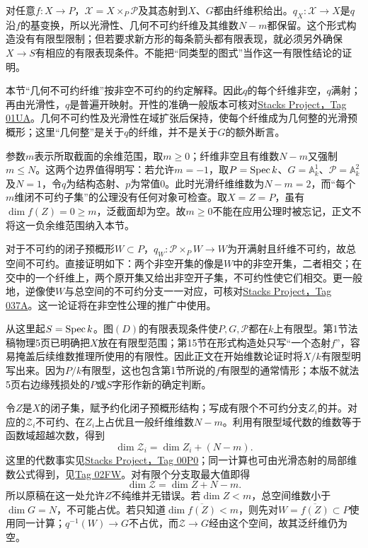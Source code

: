 对任意$f:X\to P$，$\mathcal X=X\times_P\mathcal P$及其态射到$X$、$G$都由纤维积给出。$q_X:\mathcal X\to X$是$q$沿$f$的基变换，所以光滑性、几何不可约纤维及其维数$N-m$都保留。这个形式构造没有有限型限制；但若要求新方形的每条箭头都有限表现，就必须另外确保$X\to S$有相应的有限表现条件。不能把“同类型的图式”当作这一有限性结论的证明。

本节“几何不可约纤维”按非空不可约的约定解释。因此$q$的每个纤维非空，$q$满射；再由光滑性，$q$是普遍开映射。开性的准确一般版本可核对\href{https://stacks.math.columbia.edu/tag/01UA}{Stacks Project，Tag 01UA}。几何不可约性及光滑性在域扩张后保持，使每个纤维成为几何整的光滑预概形；这里“几何整”是关于$q$的纤维，并不是关于$G$的额外断言。

参数$m$表示所取截面的余维范围，取$m\geq0$；纤维非空且有维数$N-m$又强制$m\leq N$。这两个边界值得明写：若允许$m=-1$，取$P=\operatorname{Spec} k$、$G=\mathbb A^1_k$、$\mathcal P=\mathbb A^2_k$及$N=1$，令$q$为结构态射、$p$为常值$0$。此时光滑纤维维数为$N-m=2$，而“每个$m$维闭不可约子集”的公理没有任何对象可检查。取$X=Z=P$，虽有$\dim f(Z)=0\geq m$，泛截面却为空。故$m\geq0$不能在应用公理时被忘记，正文不将这一负余维范围纳入本节。

对于不可约的闭子预概形$W\subset P$，$q_W:\mathcal P\times_PW\to W$为开满射且纤维不可约，故总空间不可约。直接证明如下：两个非空开集的像是$W$中的非空开集，二者相交；在交中的一个纤维上，两个原开集又给出非空开子集，不可约性使它们相交。更一般地，逆像使$W$与总空间的不可约分支一一对应，可核对\href{https://stacks.math.columbia.edu/tag/037A}{Stacks Project，Tag 037A}。这一论证将在非空性公理的推广中使用。

从这里起$S=\operatorname{Spec} k$。图$(D)$的有限表现条件使$P,G,\mathcal P$都在$k$上有限型。第1节法稿物理5页已明确把$X$放在有限型范围；第15节在形式构造处只写“一个态射$f$”，容易掩盖后续维数推理所使用的有限性。因此正文在开始维数论证时将$X/k$有限型明写出来。因为$P/k$有限型，这也包含第1节所说的$f$有限型的通常情形；本版不就法5页右边缘残损处的$P$或$S$字形作新的确定判断。

令$Z$是$X$的闭子集，赋予约化闭子预概形结构；写成有限个不可约分支$Z_i$的并。对应的$\mathcal Z_i$不可约、在$Z_i$上占优且一般纤维维数$N-m$。利用有限型域代数的维数等于函数域超越次数，得到
\[
\dim\mathcal Z_i
 =\dim Z_i+(N-m).
\]
这里的代数事实见\href{https://stacks.math.columbia.edu/tag/00P0}{Stacks Project，Tag 00P0}；同一计算也可由光滑态射的局部维数公式得到，见\href{https://stacks.math.columbia.edu/tag/02FW}{Tag 02FW}。对有限个分支取最大值即得
\[
\dim\mathcal Z=\dim Z+N-m.
\]
所以原稿在这一处允许$Z$不纯维并无错误。若$\dim Z<m$，总空间维数小于$\dim G=N$，不可能占优。若只知道$\dim\overline{f(Z)}<m$，则先对$W=\overline{f(Z)}\subset P$使用同一计算；$q^{-1}(W)\to G$不占优，而$\mathcal Z\to G$经由这个空间，故其泛纤维仍为空。


